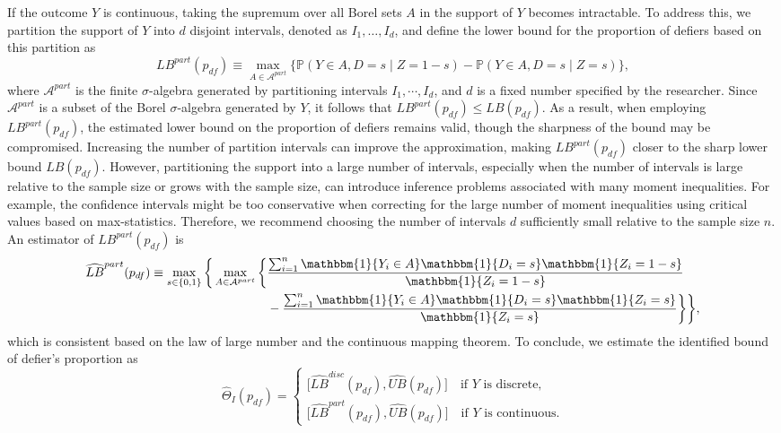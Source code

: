 \documentclass[12pt]{article}
\theoremstyle{plain}
\theoremstyle{definition}
\theoremstyle{remark}
\begin{document}
If the outcome $Y$ is continuous, taking the supremum over all Borel sets $A$ in the support of $Y$ becomes intractable. To address this, we partition the support of $Y$ into $d$ disjoint intervals, denoted as $I_1, \dots, I_d$, and define the lower bound for the proportion of defiers based on this partition as
\begin{equation*}
    LB^{part}(p_{df}) \equiv \max_{A \in \mathcal{A}^{part}}\{\mathbb{P}(Y \in A, D=s \mid Z=1-s)-\mathbb{P}(Y \in A, D=s \mid Z=s)\},
\end{equation*}
where $\mathcal{A}^{part}$ is the finite $\sigma$-algebra generated by partitioning intervals $I_1, \cdots, I_d$, and $d$ is a fixed number specified by the researcher. Since $\mathcal{A}^{part}$ is a subset of the Borel $\sigma$-algebra generated by $Y$, it follows that $LB^{part}(p_{df}) \leq LB(p_{df})$. As a result, when employing $LB^{part}(p_{df})$, the estimated lower bound on the proportion of defiers remains valid, though the sharpness of the bound may be compromised. Increasing the number of partition intervals can improve the approximation, making $LB^{part}(p_{df})$ closer to the sharp lower bound $LB(p_{df})$. However, partitioning the support into a large number of intervals, especially when the number of intervals is large relative to the sample size or grows with the sample size, can introduce inference problems associated with many moment inequalities. For example, the confidence intervals might be too conservative when correcting for the large number of moment inequalities using critical values based on max-statistics. Therefore, we recommend choosing the number of intervals $d$ sufficiently small relative to the sample size $n$. An estimator of $LB^{part}(p_{df})$ is 
\begin{equation*}
    \begin{aligned}
        \widehat{LB}^{part}(p_{df}) \equiv \max_{s \in \{0,1\}}\bigg\{ \max_{A \in \mathcal{A}^{part}} \bigg\{ & \frac{\sum_{i=1}^{n} \mathbbm{1} \{Y_i \in A\} \mathbbm{1}\{D_i = s\} \mathbbm{1}\{Z_i = 1-s\}}{\mathbbm{1}\{Z_i = 1-s\}} \\
        &- \frac{\sum_{i=1}^{n} \mathbbm{1} \{Y_i \in A\} \mathbbm{1}\{D_i = s\} \mathbbm{1}\{Z_i = s\}}{\mathbbm{1}\{Z_i = s\}} \bigg\} \bigg\},
    \end{aligned}
\end{equation*}
which is consistent based on the law of large number and the continuous mapping theorem. To conclude, we estimate the identified bound of defier's proportion as 
\begin{equation*}
    \widehat{\Theta}_I(p_{d f})=\left\{\begin{array}{l}
        \big[\widehat{LB}^{disc}(p_{df}), \widehat{UB}(p_{df}) \big] \quad \text {if $Y$ is discrete,} \\
        \big[\widehat{LB}^{part}(p_{df}), \widehat{UB}(p_{df})\big] \quad \text {if $Y$ is continuous.}
        \end{array}\right.
\end{equation*}
\end{document}
